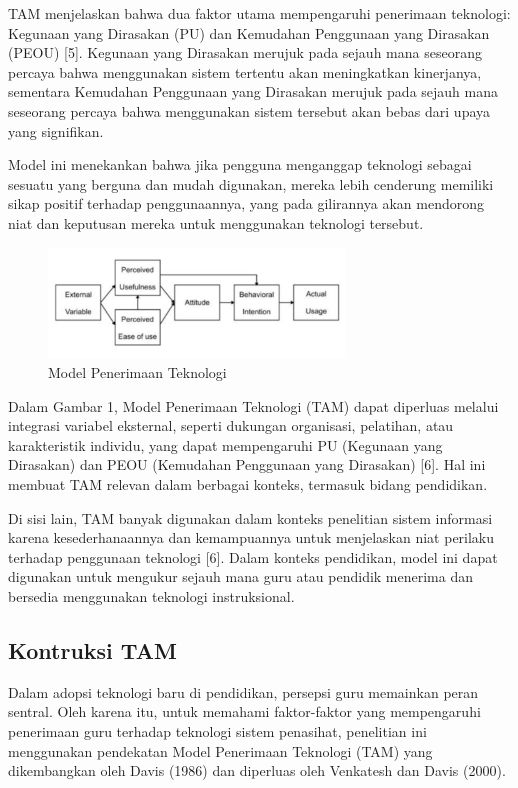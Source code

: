     TAM menjelaskan bahwa dua faktor utama mempengaruhi penerimaan teknologi: Kegunaan yang Dirasakan (PU) dan Kemudahan Penggunaan yang Dirasakan (PEOU) [5]. Kegunaan yang Dirasakan merujuk pada sejauh mana seseorang percaya bahwa menggunakan sistem tertentu akan meningkatkan kinerjanya, sementara Kemudahan Penggunaan yang Dirasakan merujuk pada sejauh mana seseorang percaya bahwa menggunakan sistem tersebut akan bebas dari upaya yang signifikan.
    
    Model ini menekankan bahwa jika pengguna menganggap teknologi sebagai sesuatu yang berguna dan mudah digunakan, mereka lebih cenderung memiliki sikap positif terhadap penggunaannya, yang pada gilirannya akan mendorong niat dan keputusan mereka untuk menggunakan teknologi tersebut.

    \begin{figure}[H]
        \centering
        \includegraphics[width=0.7\textwidth]{Gambar/gambar7.3.png}
        \caption{Model Penerimaan Teknologi}
    \end{figure}

    Dalam Gambar 1, Model Penerimaan Teknologi (TAM) dapat diperluas melalui integrasi variabel eksternal, seperti dukungan organisasi, pelatihan, atau karakteristik individu, yang dapat mempengaruhi PU (Kegunaan yang Dirasakan) dan PEOU (Kemudahan Penggunaan yang Dirasakan) [6]. Hal ini membuat TAM relevan dalam berbagai konteks, termasuk bidang pendidikan.

    Di sisi lain, TAM banyak digunakan dalam konteks penelitian sistem informasi karena kesederhanaannya dan kemampuannya untuk menjelaskan niat perilaku terhadap penggunaan teknologi [6]. Dalam konteks pendidikan, model ini dapat digunakan untuk mengukur sejauh mana guru atau pendidik menerima dan bersedia menggunakan teknologi instruksional.

\subsection{Kontruksi TAM}

    Dalam adopsi teknologi baru di pendidikan, persepsi guru memainkan peran sentral. Oleh karena itu, untuk memahami faktor-faktor yang mempengaruhi penerimaan guru terhadap teknologi sistem penasihat, penelitian ini menggunakan pendekatan Model Penerimaan Teknologi (TAM) yang dikembangkan oleh Davis (1986) dan diperluas oleh Venkatesh dan Davis (2000).

